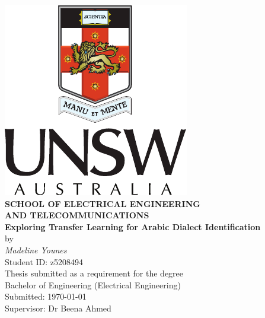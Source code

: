 
\begin{center}
\includegraphics{PortraitColourPos-eps-converted-to.pdf}\\[0.5cm]
\textbf{\large SCHOOL OF ELECTRICAL ENGINEERING\\
AND TELECOMMUNICATIONS}\\[2cm]
{\addtolength{\baselineskip}{0.5cm}
\textbf{\Huge
Exploring Transfer Learning for Arabic Dialect Identification} \\[0.5cm]
}
{\Large by}\\[0.5cm]
\textit{\huge
Madeline Younes}\\[0.5cm]
{\Large
Student ID: z5208494}\\[1.5cm]
{\Large
Thesis submitted as a requirement for the degree\\
Bachelor of Engineering (Electrical Engineering)\\[2ex]
\vfill
Submitted: \today\\
Supervisor: Dr Beena Ahmed
\vspace*{-1cm}
}
\end{center}

